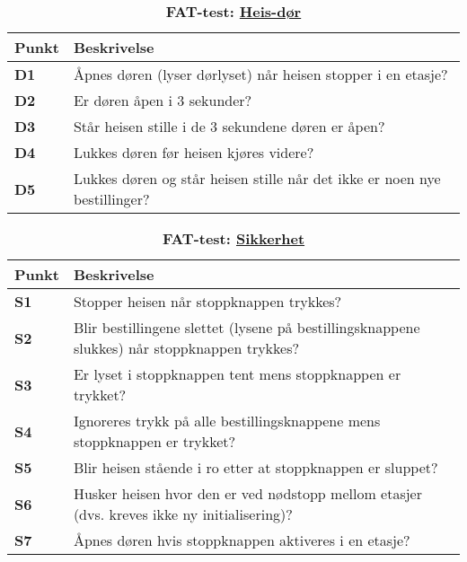 \begin{table}[H]
    \centering
    \caption*{\textbf{\textcolor{RWTHrot100}{FAT-test}: \underline{Heis-dør}}}
    \begin{tabular}{@{}  |p{1.25cm}| p{12.25cm}|  @{}}
    \hline
      \textbf{Punkt}             & \textbf{Beskrivelse} \\
    \hline
    \textbf{\textcolor{RWTHrot100}{D1}} & Åpnes døren (lyser dørlyset) når heisen stopper i en etasje?\\\cline{1-2} 
    \textbf{\textcolor{RWTHrot100}{D2}} & Er døren åpen i 3 sekunder?\\\cline{1-2} 
    \textbf{\textcolor{RWTHrot100}{D3}} & Står heisen stille i de 3 sekundene døren er åpen?\\\cline{1-2} 
 \textbf{\textcolor{RWTHrot100}{D4}} & Lukkes døren før heisen kjøres videre?\\\cline{1-2} 
 \textbf{\textcolor{RWTHrot100}{D5}} & Lukkes døren og står heisen stille når det ikke er noen nye bestillinger?\\\cline{1-2} 
    \end{tabular}
\end{table}


\begin{table}[H]
    \centering
    \caption*{\textbf{\textcolor{RWTHrot100}{FAT-test}: \underline{Sikkerhet}}}
    \begin{tabular}{@{}  |p{1.25cm}| p{12.25cm}|  @{}}
    \hline
      \textbf{Punkt}             & \textbf{Beskrivelse} \\
    \hline
    \textbf{\textcolor{RWTHrot100}{S1}} & Stopper heisen når stoppknappen trykkes?\\\cline{1-2} 
    \textbf{\textcolor{RWTHrot100}{S2}} & Blir bestillingene slettet (lysene på bestillingsknappene slukkes) når stoppknappen trykkes?\\\cline{1-2} 
    \textbf{\textcolor{RWTHrot100}{S3}} & Er lyset i stoppknappen tent mens stoppknappen er trykket?\\\cline{1-2} 
 \textbf{\textcolor{RWTHrot100}{S4}} & Ignoreres trykk på alle bestillingsknappene mens stoppknappen er trykket?\\\cline{1-2} 
 \textbf{\textcolor{RWTHrot100}{S5}} & Blir heisen stående i ro etter at stoppknappen er sluppet?\\\cline{1-2} 
 \textbf{\textcolor{RWTHrot100}{S6}} & Husker heisen hvor den er ved nødstopp mellom etasjer (dvs. kreves ikke ny initialisering)?\\\cline{1-2} 
 \textbf{\textcolor{RWTHrot100}{S7}} & Åpnes døren hvis stoppknappen aktiveres i en etasje?\\\cline{1-2} 
    \end{tabular}
\end{table}

